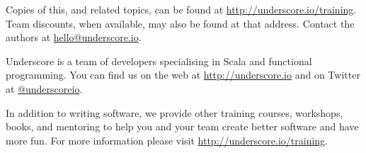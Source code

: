 \begin{center}

Copies of this, and related topics,
can be found at \href{http://underscore.io/training}{http://underscore.io/training}.
Team discounts, when available, may also be found at that address.
Contact the authors at \href{mailto:hello@underscore.io}{hello@underscore.io}.

\vspace{3em}

Underscore is a team of developers specialising in Scala and functional programming.
You can find us on the web at \href{http://underscore.io}{http://underscore.io}
and on Twitter at \href{http://twitter.com/underscoreio}{@underscoreio}.

In addition to writing software,
we provide other training courses, workshops, books, and mentoring
to help you and your team create better software and have more fun.
For more information please visit
\href{http://underscore.io/training}{http://underscore.io/training}.

\end{center}

